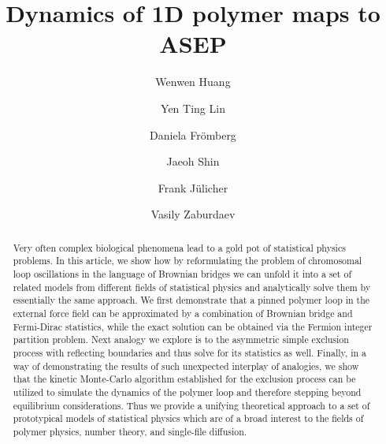 \documentclass[aps,showpacs,twocolumn,floatfix,prx,superscriptaddress]{revtex4-1}
\begin{document}
\title{Dynamics of 1D polymer maps to ASEP}

\author{Wenwen Huang}
\author{Yen Ting Lin}
\author{Daniela Fr\"{o}mberg}
\author{Jaeoh Shin}
\author{Frank J\"{u}licher}
\author{Vasily Zaburdaev}


\begin{abstract}
    Very often complex biological phenomena lead to a gold pot of statistical
    physics problems. In this article, we show how by reformulating the problem
    of chromosomal loop oscillations in the language of Brownian bridges we can
    unfold it into a set of related models from different fields of statistical
    physics and analytically solve them by essentially the same approach. We
    first demonstrate that a pinned polymer loop in the external force field can
    be approximated by a combination of Brownian bridge and Fermi-Dirac
    statistics, while the exact solution can be obtained via the Fermion integer
    partition problem. Next analogy we explore is to the asymmetric simple
    exclusion process with reflecting boundaries and thus solve for its
    statistics as well. Finally, in a way of demonstrating the results of such
    unexpected interplay of analogies, we show that the kinetic Monte-Carlo
    algorithm established for the exclusion process can be utilized to simulate
    the dynamics of the polymer loop and therefore stepping beyond equilibrium
    considerations. Thus we provide a unifying theoretical approach to a set of
    prototypical models of statistical physics which are of a broad interest to
    the fields of polymer physics, number theory, and single-file diffusion. 
\end{abstract}
\maketitle
\end{document}
